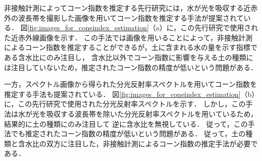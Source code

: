 





非接触計測によってコーン指数を推定する先行研究には，水が光を吸収する近赤外の波長帯を撮影した画像を用いてコーン指数を推定する手法が提案されている\cite{Fernandez2015}\cite{Rankin2010}．
図\ref{fig:images_for_coneindex_estimation}（a）に，この先行研究で使用された近赤外線画像を示す．
この手法では画像を用いることによって，非接触計測によるコーン指数を推定することができるが，土に含まれる水の量を示す指標である含水比にのみ注目し，
含水比以外でコーン指数に影響を与える土の種類には注目していないため，推定されたコーン指数の精度が低いという問題がある．

一方，スペクトル画像から得られた分光反射率スペクトルを用いてコーン指数を推定する手法も提案されている\cite{Sopher2016}．
図\ref{fig:images_for_coneindex_estimation}（b）に，この先行研究で使用された分光反射率スペクトルを示す．
しかし，この手法は水が光を吸収する波長帯を除いた分光反射率スペクトルを用いているため，結果的に土の種類にのみ注目して
逆に含水比を無視している．
従って，この手法でも推定されたコーン指数の精度が低いという問題がある．
従って，土の種類と含水比の双方に注目した，非接触計測によるコーン指数の推定手法が必要である．

